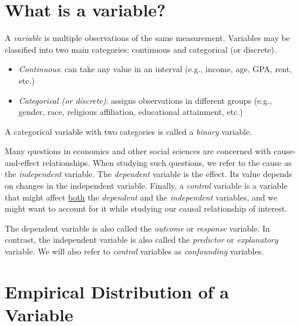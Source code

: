 \documentclass{./../../Latex/handout}
\begin{document}
\thispagestyle{plain}
\newcommand{\mytitle}{Describing Data}
\myheader{\mytitle}

\vspace{-1cm}
\section{What is a variable?}

A \textit{variable} is multiple observations of the same measurement. Variables may be classified into two main categories: continuous and categorical (or discrete).
\begin{itemize}
\item \textit{Continuous}: can take any value in an interval (e.g., income, age, GPA, rent, etc.)
\item \textit{Categorical (or discrete)}: assigns observations in different groups  (e.g., gender, race, religious affiliation, educational attainment, etc.)
\end{itemize}
A categorical variable with two categories is called a \textit{binary} variable. 

Many questions in economics and other social sciences are concerned with cause-and-effect relationships. When studying such questions, we refer to the cause as the \textit{independent} variable. The \textit{dependent} variable is the effect. Its value depends on changes in the independent variable. Finally, a \textit{control} variable is a variable that might affect \underline{both} the \textit{dependent} and the \textit{independent} variables, and we might want to account for it while studying our causal relationship of interest. 
\begin{center}
\end{center}

The dependent variable is also called the \textit{outcome} or \textit{response} variable. In contrast, the independent variable is also called the \textit{predictor} or \textit{explanatory} variable. We will also refer to \textit{control} variables as \textit{confounding} variables. 

\section{Empirical Distribution of a Variable}
\end{document}
